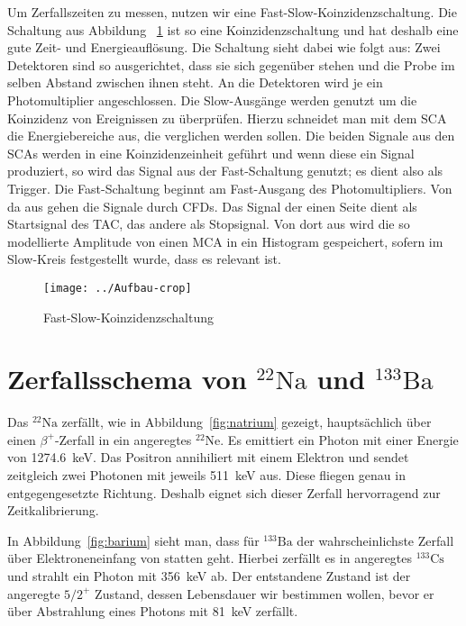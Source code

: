 \documentclass[11pt, ngerman, fleqn, DIV=15, headinclude, BCOR=2cm]{scrreprt}
\begin{document}
Um Zerfallszeiten zu messen, nutzen wir eine Fast-Slow-Koinzidenzschaltung.
Die Schaltung aus Abbildung ~\ref{fig:aufbau} ist so eine
Koinzidenzschaltung und hat deshalb eine gute Zeit- und Energieauflösung. 
Die Schaltung sieht dabei wie folgt aus: 
Zwei Detektoren sind so ausgerichtet, dass sie sich gegenüber stehen und die
Probe im selben Abstand zwischen ihnen steht. An die Detektoren wird je ein
Photomultiplier angeschlossen. Die Slow-Ausgänge werden genutzt um die
Koinzidenz von Ereignissen zu überprüfen. Hierzu schneidet man mit dem SCA die
Energiebereiche aus, die verglichen werden sollen. Die beiden Signale aus den
SCAs werden in eine Koinzidenzeinheit geführt und wenn diese ein Signal
produziert, so wird das Signal aus der Fast-Schaltung genutzt; es dient also
als Trigger. Die Fast-Schaltung beginnt am Fast-Ausgang des Photomultipliers.
Von da aus gehen die Signale durch CFDs. Das Signal der einen Seite dient als
Startsignal des TAC, das andere als Stopsignal. Von dort aus wird die so
modellierte Amplitude von einen MCA in ein Histogram gespeichert, sofern im
Slow-Kreis festgestellt wurde, dass es relevant ist.


\begin{figure}[htbp]
    \centering
    \texttt{[image: ../Aufbau-crop]}
    \caption{%
        Fast-Slow-Koinzidenzschaltung
    }
    \label{fig:aufbau}
\end{figure}

\section{Zerfallsschema von $^{22}\text{Na}$ und $^{133}\text{Ba}$}

Das $^{22}\text{Na}$ zerfällt, wie in Abbildung~\ref{fig:natrium} gezeigt, hauptsächlich über einen $\beta^+$-Zerfall in ein
angeregtes $^{22}\text{Ne}$. Es emittiert ein Photon mit einer Energie von
\SI{1274,6}{\kilo\electronvolt}. Das Positron annihiliert mit einem
Elektron und sendet zeitgleich zwei Photonen mit jeweils \SI{511}{\kilo\electronvolt}
aus. Diese fliegen genau in entgegengesetzte Richtung. Deshalb eignet
sich dieser Zerfall hervorragend zur Zeitkalibrierung. 

In Abbildung~\ref{fig:barium} sieht man, dass für $^{133}\text{Ba}$ der wahrscheinlichste Zerfall über
Elektroneneinfang von statten geht. Hierbei zerfällt es in angeregtes
$^{133}\text{Cs}$ und strahlt ein Photon mit \SI{356}{\kilo\electronvolt} ab. Der entstandene
Zustand ist der angeregte $5/2^+$ Zustand, dessen Lebensdauer wir
bestimmen wollen, bevor er über Abstrahlung eines Photons mit \SI{81}{\kilo\electronvolt}
zerfällt.
\end{document}
